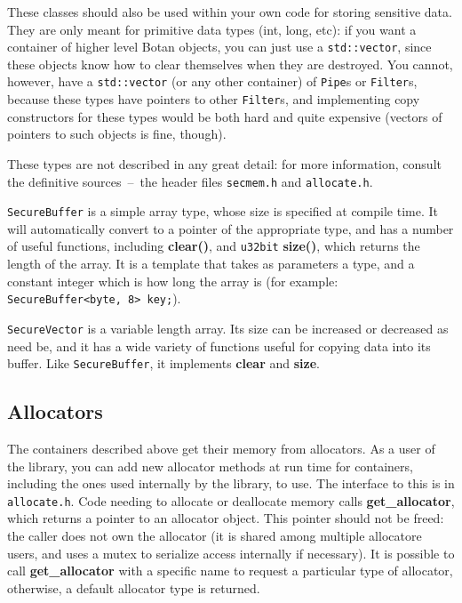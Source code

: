 \documentclass{article}
\newcommand{\filename}[1]{\texttt{#1}}
\newcommand{\function}[1]{\textbf{#1}}
\newcommand{\type}[1]{\texttt{#1}}
\begin{document}
These classes should also be used within your own code for storing
sensitive data. They are only meant for primitive data types (int,
long, etc): if you want a container of higher level Botan objects, you
can just use a \verb|std::vector|, since these objects know how to
clear themselves when they are destroyed. You cannot, however, have a
\verb|std::vector| (or any other container) of \type{Pipe}s or
\type{Filter}s, because these types have pointers to other
\type{Filter}s, and implementing copy constructors for these types
would be both hard and quite expensive (vectors of pointers to such
objects is fine, though).

These types are not described in any great detail: for more information,
consult the definitive sources~--~the header files \filename{secmem.h} and
\filename{allocate.h}.

\type{SecureBuffer} is a simple array type, whose size is specified at compile
time. It will automatically convert to a pointer of the appropriate type, and
has a number of useful functions, including \function{clear()}, and
\type{u32bit} \function{size()}, which returns the length of the array. It is a
template that takes as parameters a type, and a constant integer which is how
long the array is (for example: \verb|SecureBuffer<byte, 8> key;|).

\type{SecureVector} is a variable length array. Its size can be increased or
decreased as need be, and it has a wide variety of functions useful for copying
data into its buffer. Like \type{SecureBuffer}, it implements \function{clear}
and \function{size}.

\subsection{Allocators}

The containers described above get their memory from allocators. As a
user of the library, you can add new allocator methods at run time for
containers, including the ones used internally by the library, to
use. The interface to this is in \filename{allocate.h}. Code needing
to allocate or deallocate memory calls \function{get\_allocator},
which returns a pointer to an allocator object. This pointer should
not be freed: the caller does not own the allocator (it is shared
among multiple allocatore users, and uses a mutex to serialize access
internally if necessary). It is possible to call
\function{get\_allocator} with a specific name to request a particular
type of allocator, otherwise, a default allocator type is returned.
\end{document}

